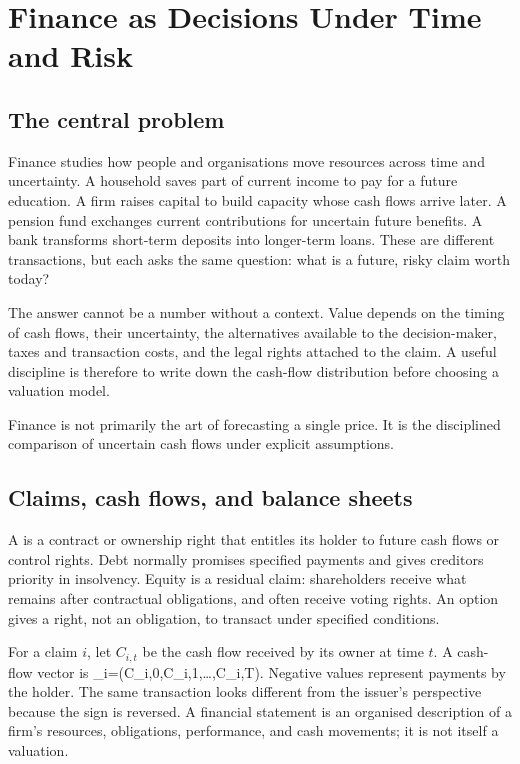 \chapter{Finance as Decisions Under Time and Risk}

\section{The central problem}
Finance studies how people and organisations move resources across time and uncertainty. A household saves part of current income to pay for a future education. A firm raises capital to build capacity whose cash flows arrive later. A pension fund exchanges current contributions for uncertain future benefits. A bank transforms short-term deposits into longer-term loans. These are different transactions, but each asks the same question: what is a future, risky claim worth today?

The answer cannot be a number without a context. Value depends on the timing of cash flows, their uncertainty, the alternatives available to the decision-maker, taxes and transaction costs, and the legal rights attached to the claim. A useful discipline is therefore to write down the cash-flow distribution before choosing a valuation model.

\begin{important}
Finance is not primarily the art of forecasting a single price. It is the disciplined comparison of uncertain cash flows under explicit assumptions.
\end{important}

\section{Claims, cash flows, and balance sheets}
A  is a contract or ownership right that entitles its holder to future cash flows or control rights. Debt normally promises specified payments and gives creditors priority in insolvency. Equity is a residual claim: shareholders receive what remains after contractual obligations, and often receive voting rights. An option gives a right, not an obligation, to transact under specified conditions.

For a claim $i$, let $C_{i,t}$ be the cash flow received by its owner at time $t$. A cash-flow vector is
  _i=(C_{i,0},C_{i,1},\ldots,C_{i,T}).
\closeformula
Negative values represent payments by the holder. The same transaction looks different from the issuer's perspective because the sign is reversed. A financial statement is an organised description of a firm's resources, obligations, performance, and cash movements; it is not itself a valuation.

